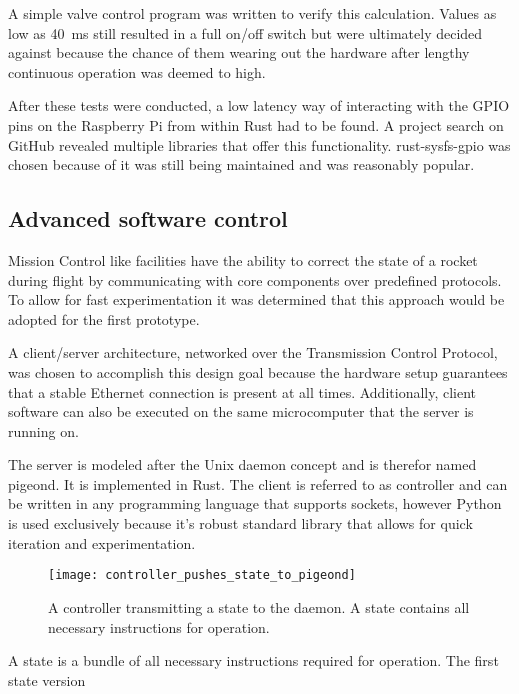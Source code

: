 A simple valve control program was written to verify this calculation. Values as low as \SI{40}{\milli\second} still resulted in a full on/off switch but were ultimately decided against because the chance of them wearing out the hardware after lengthy continuous operation was deemed to high.

After these tests were conducted, a low latency way of interacting with the GPIO pins on the Raspberry Pi from within Rust had to be found. A project search on GitHub revealed multiple libraries that offer this functionality. rust-sysfs-gpio \cite{rust-sysfs-gpio} was chosen because of it was still being maintained and was reasonably popular.  


\subsection{Advanced software control}
Mission Control like facilities have the ability to correct the state of a rocket during flight by communicating with core components over predefined protocols. To allow for fast experimentation it was determined that this approach would be adopted for the first prototype.

A client/server architecture, networked over the Transmission Control Protocol, was chosen to accomplish this design goal because the hardware setup guarantees that a stable Ethernet connection is present at all times. Additionally, client software can also be executed on the same microcomputer that the server is running on.

The server is modeled after the Unix daemon concept and is therefor named pigeond. It is implemented in Rust. The client is referred to as controller and can be written in any programming language that supports sockets, however Python is used exclusively because it's robust standard library that allows for quick iteration and experimentation.

\begin{figure}[h]
\centering

\texttt{[image: controller\_pushes\_state\_to\_pigeond]}

\caption{A controller transmitting a state to the daemon. A state contains all necessary instructions for operation.}
\end{figure}

A state is a bundle of all necessary instructions required for operation. The first state version 



